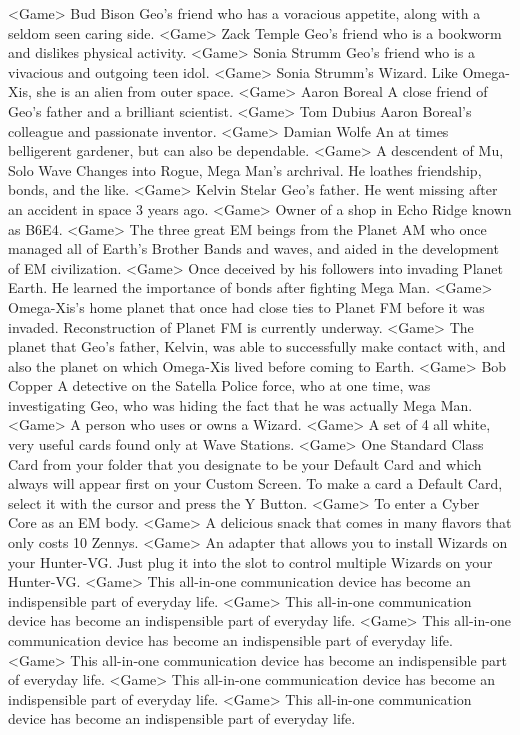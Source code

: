 <Game> Bud Bison Geo's friend who has a voracious appetite, along with a seldom seen caring side. 
<Game> Zack Temple Geo's friend who is a bookworm and dislikes physical activity. 
<Game> Sonia Strumm Geo's friend who is a vivacious and outgoing teen idol. 
<Game> Sonia Strumm's Wizard. Like Omega-Xis, she is an alien from outer space. 
<Game> Aaron Boreal A close friend of Geo's father and a brilliant scientist. 
<Game> Tom Dubius Aaron Boreal's colleague and passionate inventor. 
<Game> Damian Wolfe An at times belligerent gardener, but can also be dependable. 
<Game> A descendent of Mu, Solo Wave Changes into Rogue, Mega Man's archrival. He loathes friendship, bonds, and the like. 
<Game> Kelvin Stelar Geo's father. He went missing after an accident in space 3 years ago. 
<Game> Owner of a shop in Echo Ridge known as {B6}{E4}. 
<Game> The three great EM beings from the Planet AM who once managed all of Earth's Brother Bands and waves, and 
aided in the development of EM civilization. 
<Game> Once deceived by his followers into invading Planet Earth. He learned the importance of bonds after fighting Mega Man. 
<Game> Omega-Xis's home planet that once had close ties to Planet FM before it was invaded. Reconstruction of Planet FM is currently underway. 
<Game> The planet that Geo's father, Kelvin, was able to successfully make contact with, and also 
the planet on which Omega-Xis lived before coming to Earth. 
<Game> Bob Copper A detective on the Satella Police force, 
who at one time, was investigating Geo, who was hiding the fact that he was actually Mega Man. 
<Game> A person who uses or owns a Wizard. 
<Game> A set of 4 all white, very useful cards found only at Wave Stations. 
<Game> One Standard Class Card from your folder that you designate to be your Default Card and which 
always will appear first on your Custom Screen. To make a card a Default Card, select it 
with the cursor and press the Y Button. 
<Game> To enter a Cyber Core as an EM body. 
<Game> A delicious snack that comes in many flavors that only costs 10 Zennys. 
<Game> An adapter that allows you to install Wizards on your Hunter-VG. 
Just plug it into the slot to control multiple Wizards on your Hunter-VG. 
<Game> This all-in-one communication device has become an indispensible part of everyday life. 
<Game> This all-in-one communication device has become an indispensible part of everyday life. 
<Game> This all-in-one communication device has become an indispensible part of everyday life. 
<Game> This all-in-one communication device has become an indispensible part of everyday life. 
<Game> This all-in-one communication device has become an indispensible part of everyday life. 
<Game> This all-in-one communication device has become an indispensible part of everyday life. 
